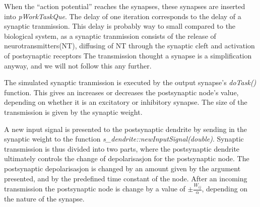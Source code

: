 	When the ``action potential'' reaches the synapses, these synapses are inserted into \emph{pWorkTaskQue}.
	The delay of one iteration corresponds to the delay of a synaptic tranmission.
	This delay is probably way to small compared to the biological system, as a synaptic tranmission consists of the release of neurotransmitters(NT), 
		diffusing of NT through the synaptic cleft and activation of postsynaptic receptors\cite{PurvesNeuroscienceKAP05}
	The transmission thought a synapse is a simplification anyway, and we will not follow this any further. %

	
	The simulated synaptic tranmission is executed by the output synapse's \emph{doTask()} function.
	This gives an increases or decreases the postsynaptic node's value, depending on whether it is an excitatory or inhibitory synapse.
	The size of the transmission is given by the synaptic weight.

	A new input signal is presented to the postsynaptic dendrite by sending in the synaptic weight to the function \emph{s\_dendrite::newInputSignal(double)}.
	Synaptic transmission is thus divided into two parts, where the postsynaptic dendrite ultimately controls the change of depolarisasjon for the postsynaptic node.
	The postsynaptic depolarisasjon is changed by an amount given by the argument presented, and by the predefined time constant of the node.
	After an incoming transmission the postsynaptic node is change by a value of $\pm \frac{W_{ij}}{\alpha}$, depending on the nature of the synapse.

